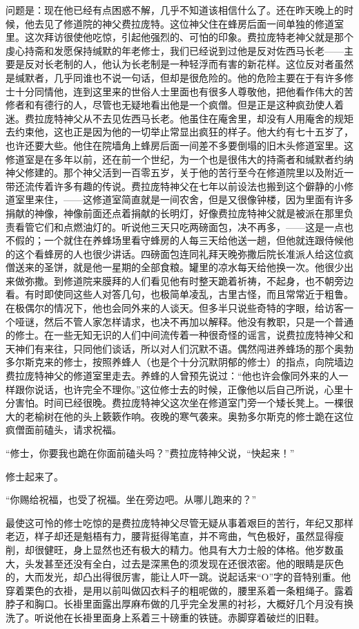 \par 问题是：现在他已经有点困惑不解，几乎不知道该相信什么了。还在昨天晚上的时候，他去见了修道院的神父费拉庞特。这位神父住在蜂房后面一间单独的修道室里。这次拜访很使他吃惊，引起他强烈的、可怕的印象。费拉庞特老神父就是那个虔心持斋和发愿保持缄默的年老修士，我们已经说到过他是反对佐西马长老——主要是反对长老制的人，他认为长老制是一种轻浮而有害的新花样。这位反对者虽然是缄默者，几乎同谁也不说一句话，但却是很危险的。他的危险主要在于有许多修士十分同情他，连到这里来的世俗人士里面也有很多人尊敬他，把他看作伟大的苦修者和有德行的人，尽管也无疑地看出他是一个疯僧。但是正是这种疯劲使人着迷。费拉庞特神父从不去见佐西马长老。他虽住在庵舍里，却没有人用庵舍的规矩去约束他，这也正是因为他的一切举止常显出疯狂的样子。他大约有七十五岁了，也许还要大些。他住在院墙角上蜂房后面一间差不多要倒塌的旧木头修道室里。这修道室是在多年以前，还在前一个世纪，为一个也是很伟大的持斋者和缄默者约纳神父修建的。那个神父活到一百零五岁，关于他的苦行至今在修道院里以及附近一带还流传着许多有趣的传说。费拉庞特神父在七年以前设法也搬到这个僻静的小修道室里来住，——这修道室简直就是一间农舍，但是又很像钟楼，因为里面有许多捐献的神像，神像前面还点着捐献的长明灯，好像费拉庞特神父就是被派在那里负责看管它们和点燃油灯的。听说他三天只吃两磅面包，决不再多，——这是一点也不假的；一个就住在养蜂场里看守蜂房的人每三天给他送一趟，但他就连跟侍候他的这个看蜂房的人也很少讲话。四磅面包连同礼拜天晚弥撒后院长准派人给这位疯僧送来的圣饼，就是他一星期的全部食粮。罐里的凉水每天给他换一次。他很少出来做弥撒。到修道院来膜拜的人们看见他有时整天跪着祈祷，不起身，也不朝旁边看。有时即使同这些人对答几句，也极简单凌乱，古里古怪，而且常常近于粗鲁。在极偶尔的情况下，他也会同外来的人谈天。但多半只说些奇特的字眼，给访客一个哑谜，然后不管人家怎样请求，也决不再加以解释。他没有教职，只是一个普通的修士。在一些无知无识的人们中间流传着一种很奇怪的谣言，说费拉庞特神父和天神们有来往，只同他们谈话，所以对人们沉默不语。偶然闯进养蜂场的那个奥勃多尔斯克来的修士，按照养蜂人（也是个十分沉默阴郁的修士）的指点，向院墙边费拉庞特神父的修道室里走去。养蜂的人曾预先说过：“他也许会像同外来的人一样跟你说话，也许完全不理你。”这位修士去的时候，正像他以后自己所说，心里十分害怕。时间已经很晚。费拉庞特神父这次坐在修道室门旁一个矮长凳上。一棵很大的老榆树在他的头上簌簌作响。夜晚的寒气袭来。奥勃多尔斯克的修士跪在这位疯僧面前磕头，请求祝福。
\par “修士，你要我也跪在你面前磕头吗？”费拉庞特神父说，“快起来！”
\par 修士起来了。
\par “你赐给祝福，也受了祝福。坐在旁边吧。从哪儿跑来的？”
\par 最使这可怜的修士吃惊的是费拉庞特神父尽管无疑从事着艰巨的苦行，年纪又那样老迈，样子却还是魁梧有力，腰背挺得笔直，并不弯曲，气色极好，虽然显得瘦削，却很健旺，身上显然也还有极大的精力。他具有大力士般的体格。他岁数虽大，头发甚至还没有全白，过去是深黑色的须发现在还很浓密。他的眼睛是灰色的，大而发光，却凸出得很厉害，能让人吓一跳。说起话来“O”字的音特别重。他穿着栗色的衣褂，是用以前叫做囚衣料子的粗呢做的，腰里系着一条粗绳子。露着脖子和胸口。长褂里面露出厚麻布做的几乎完全发黑的衬衫，大概好几个月没有换洗了。听说他在长褂里面身上系着三十磅重的铁链。赤脚穿着破烂的旧鞋。
